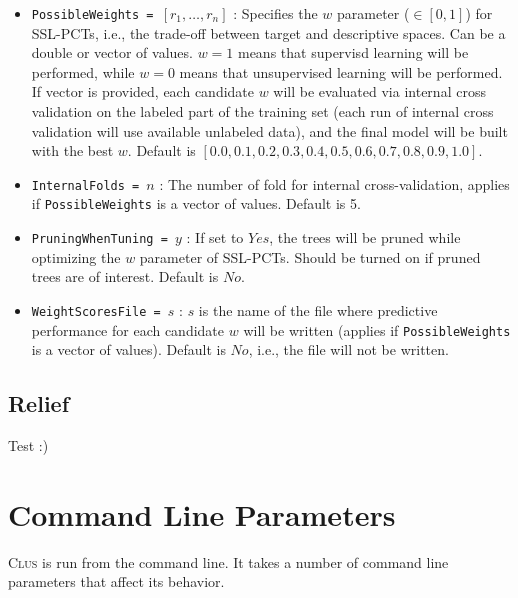 \documentclass[a4paper]{report}
\newcommand{\clus}{\textsc{Clus}}
\newcommand{\optionListsFolder}{optionListsForUse}
\begin{document}
\begin{itemize}
\item {\tt PossibleWeights = $\left[ r_1, \ldots, r_n\right]$} : Specifies the $w$ parameter ($\in [0,1]$) for SSL-PCTs, i.e., the trade-off between target and descriptive spaces. Can be a double or vector of values. $w=1$ means that supervisd learning will be performed, while $w=0$ means that unsupervised learning will be performed. If vector is provided, each candidate $w$ will be evaluated via internal cross validation on the labeled part of the training set (each run of internal cross validation will use available unlabeled data), and the final model will be built with the best $w$. Default is $[0.0,0.1,0.2,0.3,0.4,0.5,0.6,0.7,0.8,0.9,1.0]$.
\item {\tt InternalFolds = $n$} : The number of fold for internal cross-validation, applies if {\tt PossibleWeights} is a vector of values. Default is 5.
\item {\tt PruningWhenTuning = $y$} : If set to $Yes$, the trees will be pruned while optimizing the $w$ parameter of SSL-PCTs. Should be turned on if pruned trees are of interest. Default is $No$.
\item {\tt WeightScoresFile = $s$} : $s$ is the name of the file where predictive performance for each candidate $w$ will be written (applies if {\tt PossibleWeights} is a vector of values). Default is $No$, i.e., the file will not be written.
\end{itemize}

\section{Relief}
Test :)


\chapter{Command Line Parameters}
\label{param:ch}

\clus{} is run from the command line.  It takes a number of command line parameters that affect its behavior.
\end{document}
